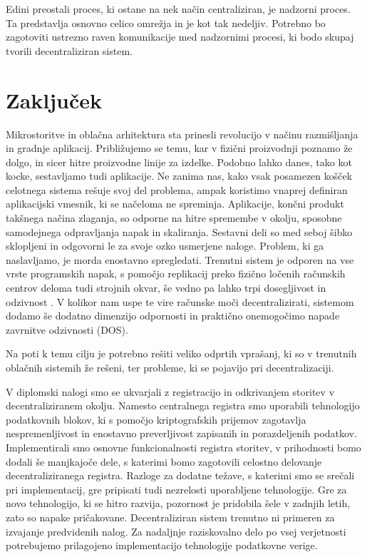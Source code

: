 \documentclass[a4paper, 12pt]{book}
\begin{document}
Edini preostali proces, ki ostane na nek način centraliziran, je nadzorni proces.
Ta predstavlja osnovno celico omrežja in je kot tak nedeljiv.
Potrebno bo zagotoviti ustrezno raven komunikacije med nadzornimi procesi, ki bodo skupaj tvorili decentraliziran sistem.


\chapter{Zaključek}
\label{stroka}

Mikrostoritve in oblačna arhitektura sta prinesli revolucijo v načinu ra\-zmišlja\-nja in gradnje aplikacij.
Približujemo se temu, kar v fizični proizvodnji poznamo že dolgo, in sicer hitre proizvodne linije za izdelke.
Podobno lahko danes, tako kot kocke, sestavljamo tudi aplikacije.
Ne zanima nas, kako vsak posamezen košček celotnega sistema rešuje svoj del problema, ampak koristimo vnaprej definiran aplikacijski vmesnik, ki se načeloma ne spreminja.
Aplikacije, končni produkt takšnega načina zlaganja, so odporne na hitre spremembe v okolju, sposobne samodejnega odpravljanja napak in skaliranja.
Sestavni deli so med seboj šibko sklopljeni in odgovorni le za svoje ozko usmerjene naloge.
Problem, ki ga naslavljamo, je morda enostavno spregledati.
Trenutni sistem je odporen na vse vrste programskih napak, s pomočjo replikacij preko fizično ločenih računskih centrov deloma tudi strojnih okvar, še vedno pa lahko trpi dosegljivost in odzivnost \cite{awsFail}.
V kolikor nam uspe te vire računske moči decentralizirati, sistemom dodamo še dodatno dimenzijo odpornosti in praktično onemogočimo napade zavrnitve odzivnosti (DOS).

Na poti k temu cilju je potrebno rešiti veliko odprtih vprašanj, ki so v trenutnih oblačnih sistemih že rešeni, ter probleme, ki se pojavijo pri decentralizaciji.

V diplomski nalogi smo se ukvarjali z registracijo in odkrivanjem storitev v decentraliziranem okolju.
Namesto centralnega registra smo uporabili tehnologijo podatkovnih blokov, ki s pomočjo kriptografskih prijemov zagotavlja nespremenljivost in enostavno preverljivost zapisanih in porazdeljenih podatkov.
Implementirali smo osnovne funkcionalnosti registra storitev, v prihodnosti bomo dodali še manjkajoče dele, s katerimi bomo zagotovili celostno delovanje decentraliziranega registra.
Razloge za dodatne težave, s katerimi smo se srečali pri implementacij, gre pripisati tudi nezrelosti uporabljene tehnologije.
Gre za novo tehnologijo, ki se hitro razvija, pozornost je pridobila šele v zadnjih letih, zato so napake pričakovane.
Decentraliziran sistem trenutno ni primeren za izvajanje predvidenih nalog.
Za nadaljnje raziskovalno delo po vsej verjetnosti potrebujemo prilagojeno implementacijo tehnologije podatkovne verige.
\end{document}

